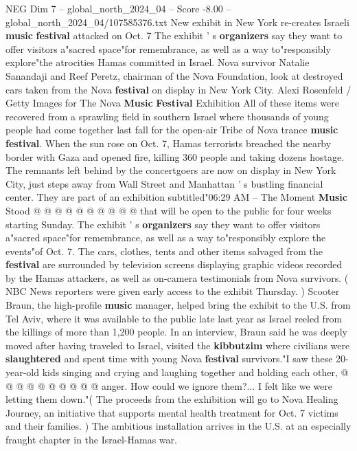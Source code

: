 \begin{textsample}{NEG Dim 7 – global\_north\_2024\_04 – Score -8.00 – global\_north\_2024\_04/107585376.txt}  \label{ex:f7_neg_229}
New exhibit in New York re-creates Israeli \textbf{music} \textbf{festival} attacked on Oct. 7 The exhibit ' s \textbf{organizers} say they want to offer visitors a"sacred space"for remembrance, as well as a way to"responsibly explore"the atrocities Hamas committed in Israel.
Nova survivor Natalie Sanandaji and Reef Peretz, chairman of the Nova Foundation, look at destroyed cars taken from the Nova \textbf{festival} on display in New York City.
Alexi Rosenfeld / Getty Images for The Nova \textbf{Music} \textbf{Festival} Exhibition All of these items were recovered from a sprawling field in southern Israel where thousands of young people had come together last fall for the open-air Tribe of Nova trance \textbf{music} \textbf{festival}.
When the sun rose on Oct. 7, Hamas terrorists breached the nearby border with Gaza and opened fire, killing 360 people and taking dozens hostage.
The remnants left behind by the concertgoers are now on display in New York City, just steps away from Wall Street and Manhattan ' s bustling financial center.
They are part of an exhibition subtitled"06:29 AM -- The Moment \textbf{Music} Stood @ @ @ @ @ @ @ @ @ @ that will be open to the public for four weeks starting Sunday.
The exhibit ' s \textbf{organizers} say they want to offer visitors a"sacred space"for remembrance, as well as a way to"responsibly explore the events"of Oct. 7.
The cars, clothes, tents and other items salvaged from the \textbf{festival} are surrounded by television screens displaying graphic videos recorded by the Hamas attackers, as well as on-camera testimonials from Nova survivors. ( NBC News reporters were given early access to the exhibit Thursday. ) Scooter Braun, the high-profile \textbf{music} manager, helped bring the exhibit to the U.S. from Tel Aviv, where it was available to the public late last year as Israel reeled from the killings of more than 1,200 people.
In an interview, Braun said he was deeply moved after having traveled to Israel, visited the \textbf{kibbutzim} where civilians were \textbf{slaughtered} and spent time with young Nova \textbf{festival} survivors."I saw these 20-year-old kids singing and crying and laughing together and holding each other, @ @ @ @ @ @ @ @ @ @ anger.
How could we ignore them?...
I felt like we were letting them down."( The proceeds from the exhibition will go to Nova Healing Journey, an initiative that supports mental health treatment for Oct. 7 victims and their families. ) The ambitious installation arrives in the U.S. at an especially fraught chapter in the Israel-Hamas war.

\end{textsample}
